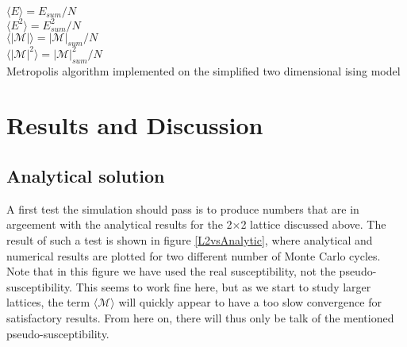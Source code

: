 \documentclass[twoside,utf8]{article}
\newcommand{\expe}[1]{ \langle #1 \rangle }
\begin{document}
\begin{algorithm}[H]
 \LinesNumbered
 $\expe{E} = E_{sum}/N$ \\
 $\expe{E^2} = E^2_{sum}/N$ \\
 $\expe{|\mathcal{M}|} = |\mathcal{M}|_{sum}/N$ \\
 $\expe{|\mathcal{M}|^2} = |\mathcal{M}|^2_{sum}/N$ \\
 \caption{Metropolis algorithm implemented on the simplified two dimensional ising model}
 \label{metropolisCode}
\end{algorithm}


\section{Results and Discussion}



\subsection{Analytical solution}
\noindent
A first test the simulation should pass is to produce numbers that are in argeement with the analytical results for the 2$\times$2 lattice discussed above. The result of such a test is shown in figure \ref*{L2vsAnalytic}, where analytical and numerical results are plotted for two different number of Monte Carlo cycles. Note that in this figure we have used the real susceptibility, not the pseudo-susceptibility. This seems to work fine here, but as we start to study larger lattices, the term $\expe{\mathcal{M}}$ will quickly appear to have a too slow convergence for satisfactory results. From here on, there will thus only be talk of the mentioned pseudo-susceptibility.
\end{document}
